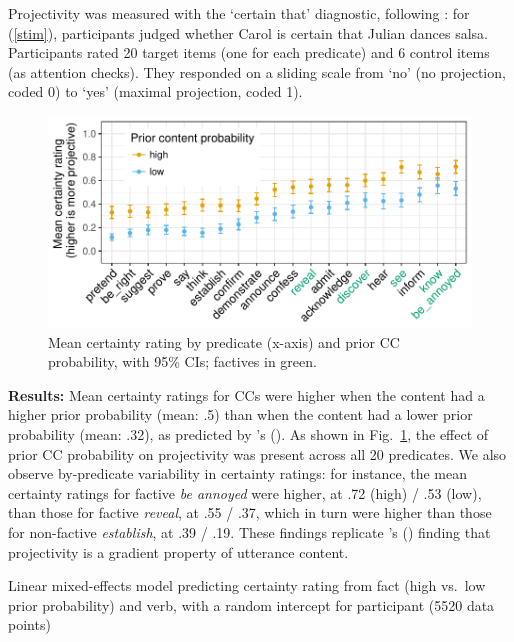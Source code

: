 \documentclass[12pt,fleqn]{article}
\newcommand{\citetpos}[1]{\citeauthor{#1}'s (\citeyear{#1})}
\newcommand{\6}{\mbox{$[\hspace*{-.6mm}[$}}
\newcommand{\9}{\mbox{$]\hspace*{-.6mm}]$}}
\begin{document}
\noindent Projectivity was measured with the `certain that' diagnostic, following \citealt{tbd-variability}: for (\ref{stim}), participants judged whether Carol is certain that Julian dances salsa. Participants rated 20 target items (one for each predicate) and 6 control items (as attention checks). They responded on a sliding scale from `no' (no projection, coded 0) to `yes' (maximal projection, coded 1).
\begin{figure}
\centering
\includegraphics[width=.45\paperwidth]{../results/3-projectivity/graphs/means-projectivity-by-predicate-and-facttype}
\caption{Mean certainty rating by predicate (x-axis) and prior CC probability, with 95\% CIs; factives in green.}\label{f-proj}
\end{figure}

\noindent
{\bf Results:} Mean certainty ratings for CCs were higher when the content had a higher prior probability (mean: .5) than when the content had a lower prior probability (mean: .32), as predicted by \citetpos{tbd-variability}. As shown in Fig.~\ref{f-proj}, the effect of prior CC probability on projectivity was present across all 20 predicates. We also observe by-predicate variability in certainty ratings:  for instance, the mean certainty ratings for factive {\em be annoyed} were higher, at .72 (high) / .53 (low), than those for factive {\em reveal}, at .55 / .37, which in turn were higher than those for non-factive {\em establish}, at .39 / .19. These findings replicate \citetpos{tbd-variability} finding that projectivity is a gradient property of utterance content.



Linear mixed-effects model predicting certainty rating from fact (high vs.\ low prior probability) and verb, with a random intercept for participant (5520 data points)
\end{document}
